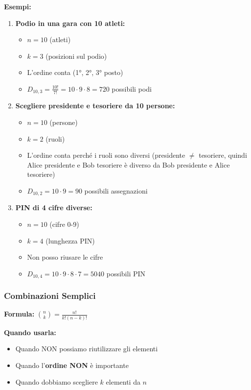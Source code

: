 \textbf{Esempi:}
\begin{enumerate}
    \item \textbf{Podio in una gara con 10 atleti:}
    \begin{itemize}
        \item $n=10$ (atleti)
        \item $k=3$ (posizioni sul podio)
        \item L'ordine conta (1°, 2°, 3° posto)
        \item $D_{10,3} = \frac{10!}{7!} = 10 \cdot 9 \cdot 8 = 720$ possibili podi
    \end{itemize}

    \item \textbf{Scegliere presidente e tesoriere da 10 persone:}
    \begin{itemize}
        \item $n=10$ (persone)
        \item $k=2$ (ruoli)
        \item L'ordine conta perché i ruoli sono diversi (presidente $\neq$ tesoriere, quindi Alice presidente e Bob tesoriere è diverso da Bob presidente e Alice tesoriere)
        \item $D_{10,2} = 10 \cdot 9 = 90$ possibili assegnazioni
    \end{itemize}

    \item \textbf{PIN di 4 cifre diverse:}
    \begin{itemize}
        \item $n=10$ (cifre 0-9)
        \item $k=4$ (lunghezza PIN)
        \item Non posso riusare le cifre
        \item $D_{10,4} = 10 \cdot 9 \cdot 8 \cdot 7 = 5040$ possibili PIN
    \end{itemize}
\end{enumerate}

\subsubsection{Combinazioni Semplici}
\textbf{Formula:} $\binom{n}{k} = \frac{n!}{k!(n-k)!}$

\textbf{Quando usarla:}
\begin{itemize}
    \item Quando NON possiamo riutilizzare gli elementi
    \item Quando l'\textbf{ordine NON} è importante
    \item Quando dobbiamo scegliere $k$ elementi da $n$
\end{itemize}

